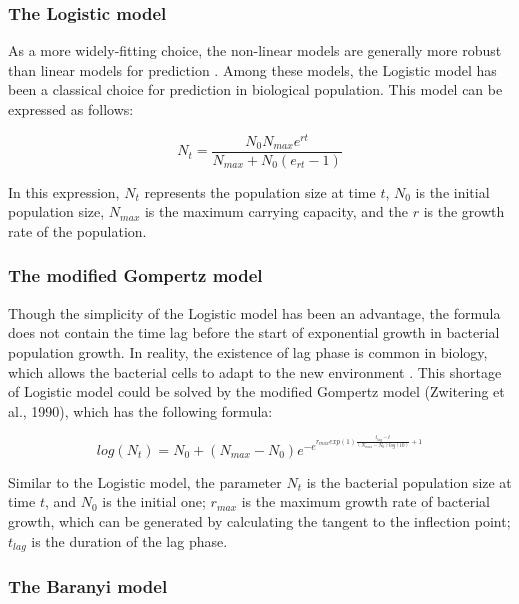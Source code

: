 \documentclass[11pt, oneside]{article}
\begin{document}
 			\subsubsection{The Logistic model}
			
			As a more widely-fitting choice, the non-linear models are generally more robust than linear models for prediction \cite{Archontolis}. Among these models, the Logistic model has been a classical choice for prediction in biological population. This model can be expressed as follows:
			
			\[N_t = \frac{N_0 N_{max} e^{rt}}{N_{max} + N_0(e_{rt} - 1)}\]
			
			\bigbreak
			\noindent In this expression, \(N_t\) represents the population size at time \(t\), \(N_0\) is the initial population size, \(N_{max}\) is the maximum carrying capacity, and the \(r\) is the growth rate of the population. 
			
			\subsubsection{The modified Gompertz model}
			
			Though the simplicity of the Logistic model has been an advantage, the formula does not contain the time lag before the start of exponential growth in bacterial population growth. In reality, the existence of lag phase is common in biology, which allows the bacterial cells to adapt to the new environment \cite{rolfe2012lag}. This shortage of Logistic model could be solved by the modified Gompertz model \cite{zwietering1991modeling}(Zwitering et al., 1990), which has the following formula:
			
			\[log(N_t) = N_0 + (N_{max} - N_0) e^{-e^{r_{max}exp(1)\frac{t_{lag}-t}{(N_{max}-N_0)log(10)} + 1}}\]
			
			\bigbreak
			\noindent Similar to the Logistic model, the parameter \(N_t\) is the bacterial population size at time \(t\), and \(N_0\) is the initial one; \(r_{max}\) is the maximum growth rate of bacterial growth, which can be generated by calculating the tangent to the inflection point; \(t_{lag}\) is the duration of the lag phase.
			
			\subsubsection{The Baranyi model}
			
\end{document}
